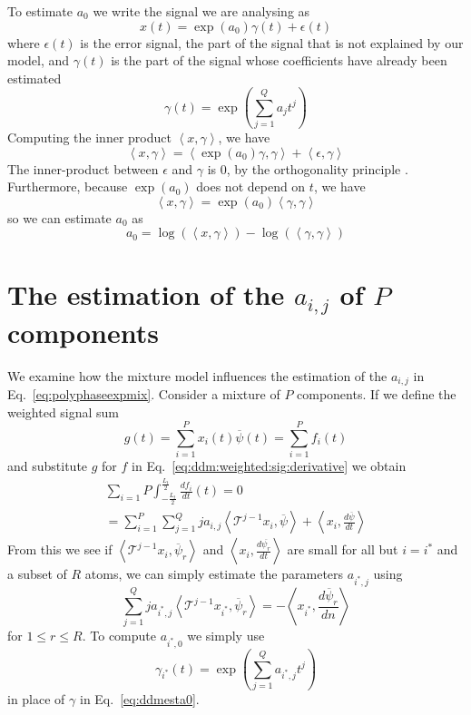 \documentclass[twoside,a4paper]{article}
\begin{document}
To estimate $a_0$ we write the signal we are analysing as
\[
    x(t) = \exp(a_0) \gamma(t) + \epsilon (t)
\]
where $\epsilon (t)$ is the error signal, the part of the signal that is not explained
by our model, and $\gamma (t)$ is the part of the signal
whose coefficients have already been estimated
\[
    \gamma(t) = \exp \left( \sum_{j=1}^{Q} a_j t^{j} \right)
\]
Computing the inner product $\left\langle x , \gamma \right\rangle$, we have
\[
    \left\langle x , \gamma \right\rangle
    =
    \left\langle \exp(a_0) \gamma , \gamma \right\rangle + 
        \left\langle \epsilon , \gamma \right\rangle
\]
The inner-product between $\epsilon$ and $\gamma$ is $0$, by the orthogonality
principle \cite[ch.~12]{kay1993fundamentals}. Furthermore, because $\exp(a_0)$ does not
depend on $t$, we have
\[
    \left\langle x , \gamma \right\rangle
    =
    \exp(a_0) \left\langle \gamma , \gamma \right\rangle
\]
so we can estimate $a_0$ as
\begin{equation}
    \label{eq:ddmesta0}
    a_0 = \log \left( \left\langle x , \gamma \right\rangle \right)
        - \log \left( \left\langle \gamma , \gamma \right\rangle \right)
\end{equation}

\section{The estimation of the $a_{i,j}$ of $P$ components}

We examine how the mixture model influences the estimation of the $a_{i,j}$ in
Eq.~\ref{eq:polyphaseexpmix}.
Consider a mixture of $P$ components.
If we define the weighted signal sum
%
\[
    g(t) = \sum_{i=1}^{P} x_{i}(t) \overline{\psi}(t) = \sum_{i=1}^{P} f_{i}(t)
\]
%
and substitute $g$ for $f$ in Eq.~\ref{eq:ddm:weighted:sig:derivative} we obtain
%
\begin{multline}
    \label{eq:mixest}
    \sum_{i=1}{P} \int_{-\frac{L_{t}}{2}}^{\frac{L_{t}}{2}} \frac{df_{i}}{dt}(t) =
    0
    \\ = 
    \sum_{i=1}^{P}
    \sum_{j=1}^{Q} j a_{i,j} 
    \left\langle \mathcal{T}^{j-1} x_i , \overline{\psi} \right\rangle
     + \left\langle x_i, \frac{d\overline{\psi}}{dt} \right\rangle
\end{multline}
%
From this we see if $\left\langle \mathcal{T}^{j-1} x_i , \overline{\psi}_{r}
\right\rangle$ and $\left\langle x_i, \frac{d\overline{\psi_{r}}}{dt} \right\rangle$
are small for all but $i = i^{\ast}$ and a subset of $R$ atoms, we
can simply estimate the parameters $a_{i^{\ast},j}$ using
\[
    \sum_{j=1}^{Q} j a_{{i^{\ast}},j} 
    \left\langle \mathcal{T}^{j-1} x_{i^{\ast}} , \overline{\psi}_{r} \right\rangle
    = -\left\langle x_{i^{\ast}}, \frac{d\overline{\psi}_{r}}{dn} \right\rangle
\]
for $1 \leq r \leq R$. To compute $a_{i^{\ast},0}$ we simply use
\[
    \gamma_{i^{\ast}}(t) = \exp \left( \sum_{j=1}^{Q} a_{i^{\ast},j} t^{j} \right)
\]
in place of $\gamma$ in Eq.~\ref{eq:ddmesta0}.
\end{document}
